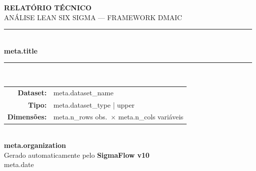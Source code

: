 \documentclass[12pt, a4paper]{article}
\begin{document}
\justifying

\begin{titlepage}
  \begin{center}
    \vspace*{2cm}
    {\large\bfseries RELAT\'ORIO T\'ECNICO}\\[0.3cm]
    {\normalsize AN\'ALISE LEAN SIX SIGMA --- FRAMEWORK DMAIC}\\[2cm]
    \rule{0.8\linewidth}{0.4pt}\\[0.6cm]
    {\LARGE\bfseries {{ meta.title }}}\\[0.4cm]
    \rule{0.8\linewidth}{0.4pt}\\[1.8cm]
    \begin{tabular}{rl}
      \textbf{Dataset:}       & {{ meta.dataset_name }} \\[0.3cm]
      \textbf{Tipo:}          & {{ meta.dataset_type | upper }} \\[0.3cm]
      \textbf{Dimens\~{o}es:} & {{ meta.n_rows }} obs.\ $\times$ {{ meta.n_cols }} vari\'aveis \\
    \end{tabular}\\[2cm]
    \vfill
    {\normalsize\textbf{ {{ meta.organization }} }}\\[0.5cm]
    {\small Gerado automaticamente pelo \textbf{SigmaFlow v10}}\\[0.3cm]
    {\small {{ meta.date }}}
  \end{center}
\end{titlepage}

\begin{abstract}
\end{abstract}
\newpage

{\hypersetup{linkcolor=black}\tableofcontents}
\newpage














\end{document}

